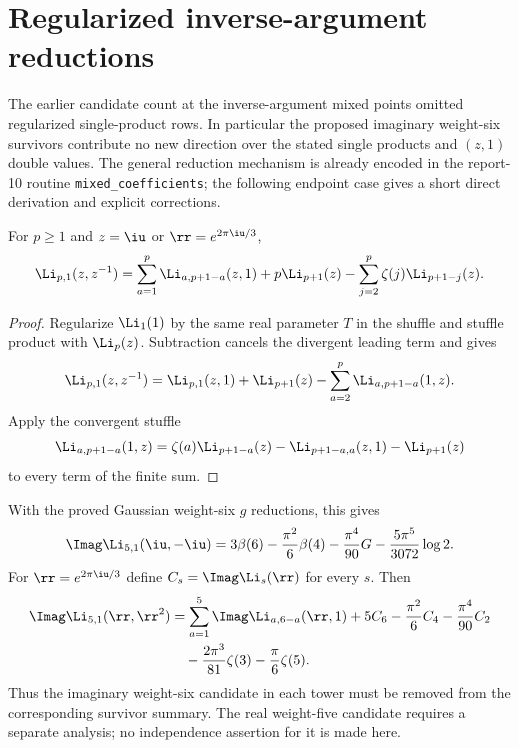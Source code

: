 
\section{Regularized inverse-argument reductions}
\label{mixed:sec:regularized-correction}

The earlier candidate count at the inverse-argument mixed points omitted
regularized single-product rows. In particular the proposed imaginary
weight-six survivors contribute no new direction over the stated
single products and $(z,1)$ double values. The general reduction
mechanism is already encoded in the report-10 routine
\texttt{mixed\_coefficients}; the following endpoint case gives a short
direct derivation and explicit corrections.

\begin{theorem}
For $p\ge1$ and $z=\iu$ or $\rr=e^{2\pi\iu/3}$,
\[
 \Li_{p,1}(z,z^{-1})
 =\sum_{a=1}^{p}\Li_{a,p+1-a}(z,1)+p\Li_{p+1}(z)
       -\sum_{j=2}^{p}\zeta(j)\Li_{p+1-j}(z).
\]
\end{theorem}
\begin{proof}
Regularize $\Li_1(1)$ by the same real parameter $T$ in the shuffle
and stuffle product with $\Li_p(z)$. Subtraction cancels the
divergent leading term and gives
\[
 \Li_{p,1}(z,z^{-1})
 =\Li_{p,1}(z,1)+\Li_{p+1}(z)
       -\sum_{a=2}^{p}\Li_{a,p+1-a}(1,z).
\]
Apply the convergent stuffle
\[
 \Li_{a,p+1-a}(1,z)
 =\zeta(a)\Li_{p+1-a}(z)-\Li_{p+1-a,a}(z,1)-\Li_{p+1}(z)
\]
to every term of the finite sum.
\end{proof}

With the proved Gaussian weight-six $g$ reductions, this gives
\[
 \Imag\Li_{5,1}(\iu,-\iu)
 =3\beta(6)-\frac{\pi^2}{6}\beta(4)
       -\frac{\pi^4}{90}G-\frac{5\pi^5}{3072}\log2.
\]
For $\rr=e^{2\pi\iu/3}$ define $C_s=\Imag\Li_s(\rr)$ for every $s$.
Then
\begin{align*}
 \Imag\Li_{5,1}(\rr,\rr^2)
 &=\sum_{a=1}^{5}\Imag\Li_{a,6-a}(\rr,1)
       +5C_6-\frac{\pi^2}{6}C_4-\frac{\pi^4}{90}C_2\\
 &\quad-\frac{2\pi^3}{81}\zeta(3)-\frac{\pi}{6}\zeta(5).
\end{align*}
Thus the imaginary weight-six candidate in each tower must be removed
from the corresponding survivor summary. The real weight-five
candidate requires a separate analysis; no independence assertion
for it is made here.

